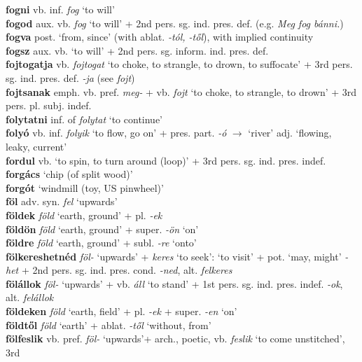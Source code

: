 \documentclass[11pt]{article}
\begin{document}
\textbf{fogni} vb. inf. \emph{fog} `to will' \\
\textbf{fogod} aux. vb. \emph{fog} `to will' + 2nd
pers. sg. ind. pres. def. (e.g. \emph{Meg fog bánni.}) \\
\textbf{fogva} post. `from, since' (with ablat. \emph{-tól, -től}),
with implied continuity \\
\textbf{fogsz} aux. vb. `to will' + 2nd
pers. sg. inform. ind. pres. def. \\
\textbf{fojtogatja} vb. \emph{fojtogat} `to
choke, to strangle, to drown, to suffocate' + 3rd
pers. sg. ind. pres. def. \emph{-ja} (see \emph{fojt}) \\
\textbf{fojtsanak} emph. vb. pref. \emph{meg-} + vb. \emph{fojt} `to
choke, to strangle, to drown' + 3rd pers. pl. subj. indef. \\
\textbf{folytatni} inf. of \emph{folytat} `to continue' \\
\textbf{folyó} vb. inf. \emph{folyik} `to flow, go on' +
pres. part. \emph{-ó} $\rightarrow$ `river' \textbar\textbar{}
adj. `flowing, leaky, current' \\
\textbf{fordul} vb. `to spin, to turn around (loop)' + 3rd
pers. sg. ind. pres. indef. \\
\textbf{forgács} `chip (of split wood)' \\
\textbf{forgót} `windmill (toy, US pinwheel)' \\
\textbf{föl} adv. syn. \emph{fel} `upwards' \\
\textbf{földek} \emph{föld} `earth, ground' + pl. \emph{-ek} \\
\textbf{földön} \emph{föld} `earth, ground' +
super. \emph{-ön} `on' \\
\textbf{földre} \emph{föld} `earth, ground' + subl. \emph{-re}
`onto' \\
\textbf{fölkereshetnéd} \emph{föl-} `upwards' + \emph{keres} `to
seek': `to visit' + pot. `may, might' \emph{-het} + 2nd
pers. sg. ind. pres. cond. \emph{-ned}, alt. \emph{felkeres} \\
\textbf{fölállok} \emph{föl-} `upwards' + vb. \emph{áll} `to stand' + 1st
  pers. sg. ind. pres. indef. \emph{-ok}, alt. \emph{felállok} \\
\textbf{földeken} \emph{föld} `earth, field' + pl. \emph{-ek} +
super. \emph{-en} `on' \\
\textbf{földtől} \emph{föld} `earth' + ablat. \emph{-től} `without,
from' \\
\textbf{fölfeslik} vb. pref. \emph{föl-} `upwards'+ arch., poetic,
vb. \emph{feslik} `to come unstitched', 3rd
\end{document}
